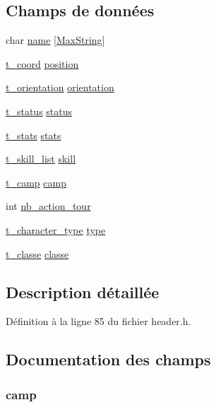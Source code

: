 \subsection*{Champs de données}
\begin{DoxyCompactItemize}
\item 
char \hyperlink{structt__character_ab27f28c5ead39031421706ddbbd1edea}{name} \mbox{[}\hyperlink{header_8h_ab154998a3a376095f3601bc35c5cf523}{Max\-String}\mbox{]}
\item 
\hyperlink{structt__coord}{t\-\_\-coord} \hyperlink{structt__character_a27c93348dcaa3ea78282fb5ef6ce371b}{position}
\item 
\hyperlink{header_8h_a6dc6eccccaf78ef029cff998c0e654f4}{t\-\_\-orientation} \hyperlink{structt__character_af778044107ad1a59b9725fa3962560ad}{orientation}
\item 
\hyperlink{structt__status}{t\-\_\-status} \hyperlink{structt__character_a3ade6b90793e915ca28b52fb70e58e3f}{status}
\item 
\hyperlink{structt__stats}{t\-\_\-stats} \hyperlink{structt__character_a29711825af64d428d19df366a5056670}{stats}
\item 
\hyperlink{structt__skill__list}{t\-\_\-skill\-\_\-list} \hyperlink{structt__character_ae7aa14804e69b1bc9652c16261da0c9f}{skill}
\item 
\hyperlink{header_8h_a4bb25c9352f7bb2ea2eb663ccf579528}{t\-\_\-camp} \hyperlink{structt__character_a48707185be865bad67e5c61e5903ae5a}{camp}
\item 
int \hyperlink{structt__character_aaff424b51f4bd3db2c199cc08f21f86d}{nb\-\_\-action\-\_\-tour}
\item 
\hyperlink{header_8h_ac8020d257c824e4b188c04ee386ebfda}{t\-\_\-character\-\_\-type} \hyperlink{structt__character_a3b5fecb9824668aab778f82005089942}{type}
\item 
\hyperlink{header_8h_a853cf4e56ef5ad960bf764a4fafe7e77}{t\-\_\-classe} \hyperlink{structt__character_a6d86411cdb6af508aed7d5904887ac6e}{classe}
\end{DoxyCompactItemize}


\subsection{Description détaillée}


Définition à la ligne 85 du fichier header.\-h.



\subsection{Documentation des champs}
\hypertarget{structt__character_a48707185be865bad67e5c61e5903ae5a}{
\subsubsection[{camp}]{ camp}}\label{structt__character_a48707185be865bad67e5c61e5903ae5a}


